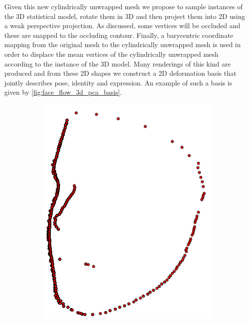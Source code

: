 Given this new cylindrically unwrapped mesh we propose to sample
instances of the 3D statistical model, rotate them in 3D and then project them
into 2D using a weak perspective projection. As discussed, some vertices
will be occluded and these are snapped to the occluding contour. Finally, a
barycentric coordinate mapping from the original mesh to the cylindrically
unwrapped mesh is used in order to displace the mean vertices of the cylindrically
unwrapped mesh according to the instance of the 3D model. Many renderings of this
kind are produced and from these 2D shapes we construct a 2D deformation basis
that jointly describes pose, identity and expression. An example of such a basis
is given by \cref{fig:face_flow_3d_pca_basis}.
\begin{figure}[t]
    \centering
    \hspace*{\fill}
    \begin{subfigure}[b]{0.23\textwidth}
        \centering
        \includegraphics[width=\textwidth]{face_flow/images/contour_snapping/posed_snapped_contour}

\end{subfigure}
\end{figure}
